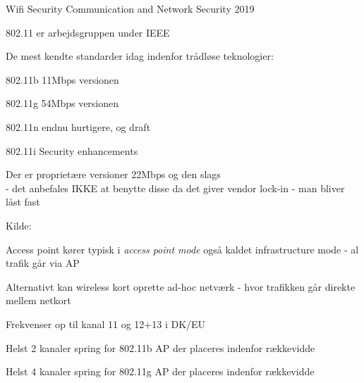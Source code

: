 \documentclass[Screen16to9,17pt]{foils}
\begin{document}
\mytitlepage
{Wifi Security}
{Communication and Network Security
2019}



\begin{list1}
\item 802.11 er arbejdsgruppen under IEEE
\item De mest kendte standarder idag indenfor trådløse teknologier:
\begin{list2}
\item 802.11b 11Mbps versionen
\item 802.11g 54Mbps versionen
\item 802.11n endnu hurtigere, og draft
\item 802.11i Security enhancements
\end{list2}
\item Der er proprietære versioner 22Mbps og den slags\\
- det anbefales IKKE at benytte disse da det giver vendor lock-in -
man bliver låst fast
\end{list1}

Kilde: 


\begin{list1}
\item Access point kører typisk i \emph{access point mode} også kaldet
  infrastructure mode - al trafik går via AP
\item Alternativt kan wireless kort oprette ad-hoc netværk - hvor
  trafikken går direkte mellem netkort
\item Frekvenser op til kanal 11 og 12+13 i DK/EU
\item Helst 2 kanaler spring for 802.11b AP der placeres indenfor rækkevidde
\item Helst 4 kanaler spring for 802.11g AP der placeres indenfor rækkevidde
\end{list1}






\end{document}
